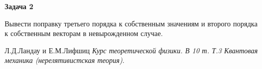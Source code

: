 \documentclass[a4paper,12pt]{article}
\begin{document}
\noindent 
\textbf{Задача 2}

\noindent
Вывести поправку третьего порядка к собственным значениям и второго порядка к собственным векторам в невырожденном случае.

\begin{thebibliography}{9}

Л.Д.Ландау и Е.М.Лифшиц
\textit{Курс теоретической физики. В 10 т. Т.3 Квантовая механика (нерелятивистская теория)}. 

\end{thebibliography}
\end{document}
